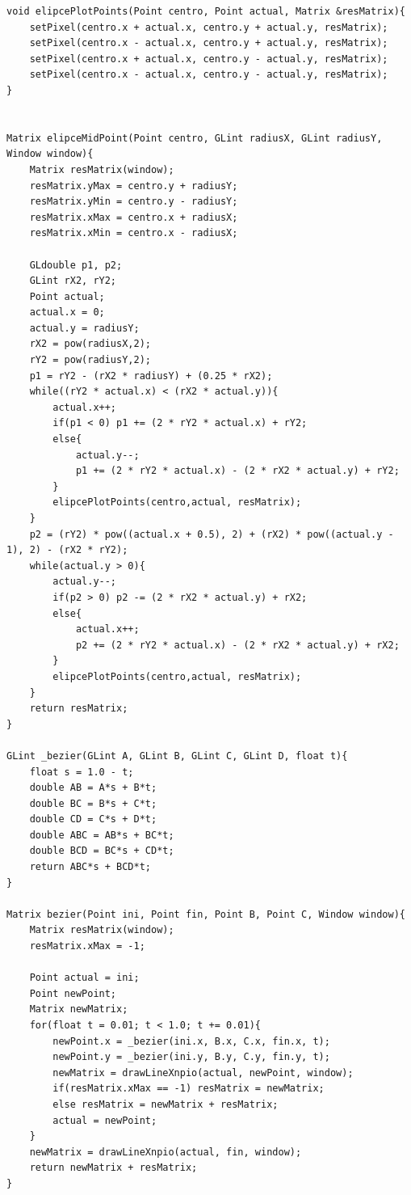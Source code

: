 \documentclass[a4paper,12pt]{article}
\begin{document}
\begin{itemize}
\begin{lstlisting}
void elipcePlotPoints(Point centro, Point actual, Matrix &resMatrix){
    setPixel(centro.x + actual.x, centro.y + actual.y, resMatrix);
    setPixel(centro.x - actual.x, centro.y + actual.y, resMatrix);
    setPixel(centro.x + actual.x, centro.y - actual.y, resMatrix);
    setPixel(centro.x - actual.x, centro.y - actual.y, resMatrix);
}


Matrix elipceMidPoint(Point centro, GLint radiusX, GLint radiusY, Window window){
    Matrix resMatrix(window);
    resMatrix.yMax = centro.y + radiusY;
    resMatrix.yMin = centro.y - radiusY;
    resMatrix.xMax = centro.x + radiusX;
    resMatrix.xMin = centro.x - radiusX;

    GLdouble p1, p2;
    GLint rX2, rY2;
    Point actual;
    actual.x = 0;
    actual.y = radiusY;
    rX2 = pow(radiusX,2);
    rY2 = pow(radiusY,2);
    p1 = rY2 - (rX2 * radiusY) + (0.25 * rX2);
    while((rY2 * actual.x) < (rX2 * actual.y)){
        actual.x++;
        if(p1 < 0) p1 += (2 * rY2 * actual.x) + rY2;
        else{
            actual.y--;
            p1 += (2 * rY2 * actual.x) - (2 * rX2 * actual.y) + rY2;
        }
        elipcePlotPoints(centro,actual, resMatrix);
    }
    p2 = (rY2) * pow((actual.x + 0.5), 2) + (rX2) * pow((actual.y - 1), 2) - (rX2 * rY2);
    while(actual.y > 0){
        actual.y--;
        if(p2 > 0) p2 -= (2 * rX2 * actual.y) + rX2;
        else{
            actual.x++;
            p2 += (2 * rY2 * actual.x) - (2 * rX2 * actual.y) + rX2;
        }
        elipcePlotPoints(centro,actual, resMatrix);
    }
    return resMatrix;
}

GLint _bezier(GLint A, GLint B, GLint C, GLint D, float t){
    float s = 1.0 - t;
    double AB = A*s + B*t;
    double BC = B*s + C*t;
    double CD = C*s + D*t;
    double ABC = AB*s + BC*t;
    double BCD = BC*s + CD*t;
    return ABC*s + BCD*t;
}

Matrix bezier(Point ini, Point fin, Point B, Point C, Window window){
    Matrix resMatrix(window);
    resMatrix.xMax = -1;

    Point actual = ini;
    Point newPoint;
    Matrix newMatrix;
    for(float t = 0.01; t < 1.0; t += 0.01){
        newPoint.x = _bezier(ini.x, B.x, C.x, fin.x, t);
        newPoint.y = _bezier(ini.y, B.y, C.y, fin.y, t);
        newMatrix = drawLineXnpio(actual, newPoint, window);
        if(resMatrix.xMax == -1) resMatrix = newMatrix;
        else resMatrix = newMatrix + resMatrix;
        actual = newPoint;
    }
    newMatrix = drawLineXnpio(actual, fin, window);
    return newMatrix + resMatrix;
}



\end{lstlisting}
\end{itemize}
\end{document}
